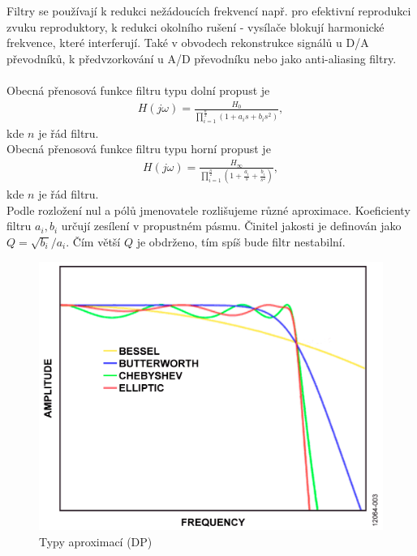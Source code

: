\documentclass[twoside]{article}
\begin{document}
\noindent Filtry se používají k redukci nežádoucích frekvencí např. pro efektivní reprodukci zvuku reproduktory, k redukci okolního rušení - vysílače blokují harmonické frekvence, které interferují. Také v obvodech rekonstrukce signálů u D/A převodníků, k předvzorkování u A/D převodníku nebo jako anti-aliasing filtry.\\\\
Obecná přenosová funkce filtru typu dolní propust je
\begin{align}
H(j\omega) = \frac{H_0}{\prod_{i=1}^{\frac{n}{2}} (1 + a_i s + b_i s^2)},
\end{align}
kde $n$ je řád filtru.\\
Obecná přenosová funkce filtru typu horní propust je
\begin{align}
H(j\omega) = \frac{H_{\infty}}{\prod_{i=1}^{\frac{n}{2}} (1 + \frac{a_i}{s} + \frac{b_i}{s^2})},
\end{align}
kde $n$ je řád filtru.\\
Podle rozložení nul a pólů jmenovatele rozlišujeme různé aproximace. Koeficienty filtru $a_i, b_i$ určují zesílení v propustném pásmu. Činitel jakosti je definován jako $Q = \sqrt{b_i}/a_i$. Čím větší $Q$ je obdrženo, tím spíš bude filtr nestabilní.
\begin{figure}[H]
\centering
\includegraphics[scale=0.3]{LGA98.png}
\caption{Typy aproximací (DP)\cite{2}}
\end{figure}
\end{document}
